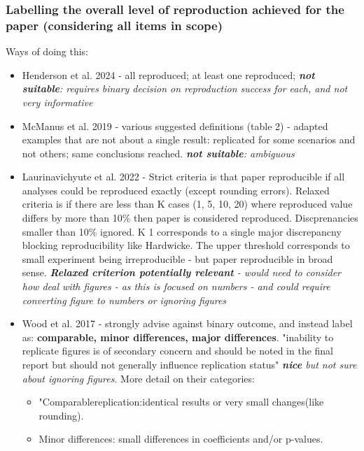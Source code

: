 \subsubsection{Labelling the overall level of reproduction achieved for the paper (considering all items in scope)}

Ways of doing this:
\begin{itemize}
    \item Henderson et al. 2024 - all reproduced; at least one reproduced;\autocite{henderson_reproducibility_2024} \textit{\textbf{not suitable}: requires binary decision on reproduction success for each, and not very informative}
    \item McManus et al. 2019 - various suggested definitions (table 2) - adapted examples that are not about a single result:  replicated for some scenarios and not others; same conclusions reached.\autocite{mcmanus_can_2019} \textit{\textbf{not suitable}: ambiguous}
    \item Laurinavichyute et al. 2022 - Strict criteria is that paper reproducible if all analyses could be reproduced exactly (except rounding errors). Relaxed criteria is if there are less than K cases (1, 5, 10, 20) where reproduced value differs by more than 10\% then paper is considered reproduced. Discprenancies smaller than 10\% ignored. K 1 corresponds to a single major discrepancny blocking reproducibility like Hardwicke. The upper threshold corresponds to small experiment being irreproducible - but paper reproducible in broad sense. \autocite{laurinavichyute_share_2022} \textit{\textbf{Relaxed criterion potentially relevant} - would need to consider how deal with figures - as this is focused on numbers - and could require converting figure to numbers or ignoring figures}
    \item Wood et al. 2017 - strongly advise against binary outcome, and instead label as: \textbf{comparable, minor differences, major differences}. "inability to replicate figures is of secondary concern and should be noted in the final report but should not generally influence replication status" \autocite{wood_push_2018, wood_replication_2018} \textit{\textbf{nice} but not sure about ignoring figures}. More detail on their categories:
    \begin{itemize}
        \item "Comparablereplication:identical results or very small changes(like rounding).
        \item Minor differences: small differences in coefficients and/or p-values.

\end{itemize}
\end{itemize}

